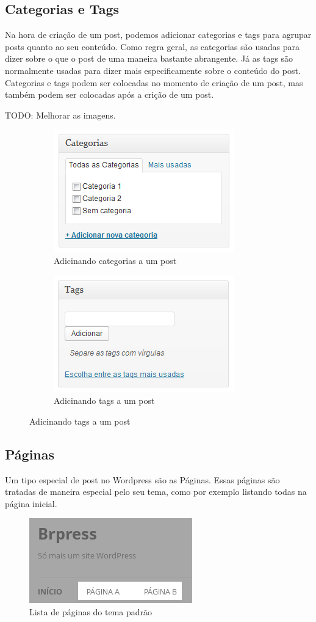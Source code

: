 \documentclass[12pt,onecolumn]{article}
\begin{document}
	\subsection{Categorias e Tags}
		Na hora de criação de um post, podemos adicionar categorias e tags 
		para agrupar posts quanto ao seu conteúdo. Como regra geral, as
		categorias são usadas para dizer sobre o que o post de uma maneira
		bastante abrangente. Já as tags são normalmente usadas para dizer
		mais especificamente sobre o conteúdo do post. Categorias e tags
		podem ser colocadas no momento de criação de um post, mas
		também podem ser colocadas após a crição de um post.

		TODO: Melhorar as imagens.
		\begin{figure}[H]
			\begin{subfigure}{.55\textwidth}
				\centering
				\includegraphics{categorias1.png}
				\caption{Adicinando categorias a um post}
			\end{subfigure}
			\begin{subfigure}{.4\textwidth}
				\centering
				\includegraphics{tags1.png}
				\caption{Adicinando tags a um post}
			\end{subfigure}
		\end{figure}

	\subsection{Páginas}
		Um tipo especial de post no Wordpress são as Páginas.
		Essas páginas são tratadas de maneira especial pelo seu tema, como por
		exemplo listando todas na página inicial.
		\begin{figure}[H]
			\centering
			\includegraphics{page1.png}
			\caption{Lista de páginas do tema padrão}
		\end{figure}
		
\end{document}
